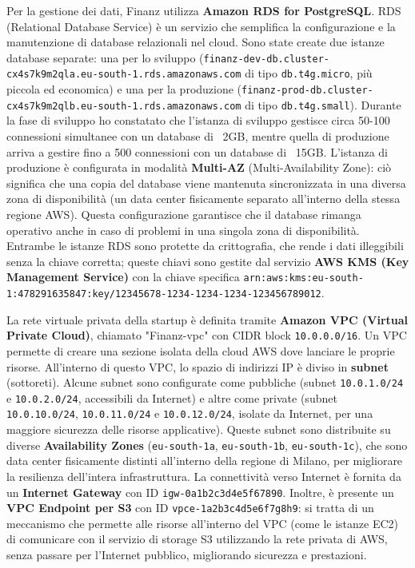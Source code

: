 Per la gestione dei dati, Finanz utilizza \textbf{Amazon RDS for PostgreSQL}. RDS (Relational Database Service) è un servizio che semplifica la configurazione e la manutenzione di database relazionali nel cloud. Sono state create due istanze database separate: una per lo sviluppo (\texttt{finanz-dev-db.cluster-cx4s7k9m2qla.eu-south-1.rds.amazonaws.com} di tipo \texttt{db.t4g.micro}, più piccola ed economica) e una per la produzione (\texttt{finanz-prod-db.cluster-cx4s7k9m2qlb.eu-south-1.rds.amazonaws.com} di tipo \texttt{db.t4g.small}). Durante la fase di sviluppo ho constatato che l'istanza di sviluppo gestisce circa 50-100 connessioni simultanee con un database di ~2GB, mentre quella di produzione arriva a gestire fino a 500 connessioni con un database di ~15GB. L'istanza di produzione è configurata in modalità \textbf{Multi-AZ} (Multi-Availability Zone): ciò significa che una copia del database viene mantenuta sincronizzata in una diversa zona di disponibilità (un data center fisicamente separato all'interno della stessa regione AWS). Questa configurazione garantisce che il database rimanga operativo anche in caso di problemi in una singola zona di disponibilità. Entrambe le istanze RDS sono protette da crittografia, che rende i dati illeggibili senza la chiave corretta; queste chiavi sono gestite dal servizio \textbf{AWS KMS (Key Management Service)} con la chiave specifica \texttt{arn:aws:kms:eu-south-1:478291635847:key/12345678-1234-1234-1234-123456789012}.

La rete virtuale privata della startup è definita tramite \textbf{Amazon VPC (Virtual Private Cloud)}, chiamato "Finanz-vpc" con CIDR block \texttt{10.0.0.0/16}. Un VPC permette di creare una sezione isolata della cloud AWS dove lanciare le proprie risorse. All'interno di questo VPC, lo spazio di indirizzi IP è diviso in \textbf{subnet} (sottoreti). Alcune subnet sono configurate come pubbliche (subnet \texttt{10.0.1.0/24} e \texttt{10.0.2.0/24}, accessibili da Internet) e altre come private (subnet \texttt{10.0.10.0/24}, \texttt{10.0.11.0/24} e \texttt{10.0.12.0/24}, isolate da Internet, per una maggiore sicurezza delle risorse applicative). Queste subnet sono distribuite su diverse \textbf{Availability Zones} (\texttt{eu-south-1a}, \texttt{eu-south-1b}, \texttt{eu-south-1c}), che sono data center fisicamente distinti all'interno della regione di Milano, per migliorare la resilienza dell'intera infrastruttura. La connettività verso Internet è fornita da un \textbf{Internet Gateway} con ID \texttt{igw-0a1b2c3d4e5f67890}. Inoltre, è presente un \textbf{VPC Endpoint per S3} con ID \texttt{vpce-1a2b3c4d5e6f7g8h9}: si tratta di un meccanismo che permette alle risorse all'interno del VPC (come le istanze EC2) di comunicare con il servizio di storage S3 utilizzando la rete privata di AWS, senza passare per l'Internet pubblico, migliorando sicurezza e prestazioni.

